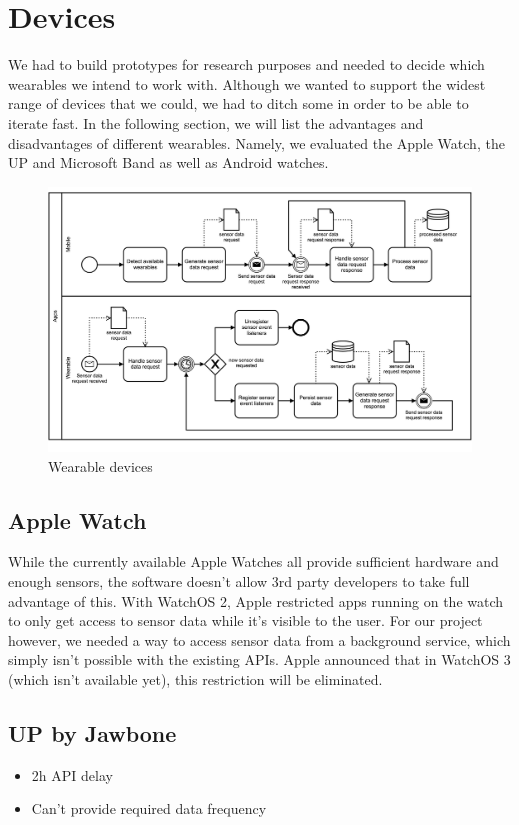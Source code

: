 \section{Devices}
\label{sec:devices}

We had to build prototypes for research purposes and needed to decide which wearables we intend to work with.
Although we wanted to support the widest range of devices that we could, we had to ditch some in order to be able to iterate fast.
In the following section, we will list the advantages and disadvantages of different wearables.
Namely, we evaluated the Apple Watch, the UP and Microsoft Band as well as Android watches.

\begin{figure}[H]
	\includegraphics[width=\linewidth]{diagrams/apps.png}
	\caption[Caption for devices]{Wearable devices}
	\label{fig:devices}
\end{figure}

\subsection{Apple Watch}
While the currently available Apple Watches all provide sufficient hardware and enough sensors, the software doesn't allow 3rd party developers to take full advantage of this.
With WatchOS 2, Apple restricted apps running on the watch to only get access to sensor data while it's visible to the user.
For our project however, we needed a way to access sensor data from a background service, which simply isn't possible with the existing APIs.
Apple announced that in WatchOS 3 (which isn't available yet), this restriction will be eliminated. 

\subsection{UP by Jawbone}
\begin{itemize}[noitemsep]
	\item 2h API delay
	\item Can't provide required data frequency
\end{itemize}

